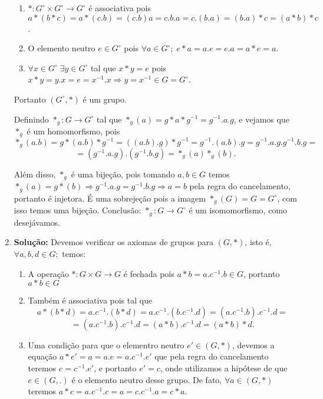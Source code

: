 \documentclass{article}
\begin{document}
\begin{enumerate}
\begin{enumerate}
			\item $*: G^{\circ} \times G^{\circ} \to G^{\circ}$ é associativa pois $a*(b*c) = a*(c.b) = (c.b)a = c.b.a = c.(b.a) = (b.a)*c = (a*b)*c$.
			
			\item O elemento neutro $e \in G^{\circ}$ pois $\forall a \in G^{\circ}; \; e*a = a.e = e.a = a*e =a$.
			
			\item $\forall x \in G^{\circ} \; \exists y \in G^{\circ}$ tal que $x*y=e$ pois $x*y= y.x = e= x^{-1}.x \Rightarrow y = x^{-1} \in G = G^{\circ}$.
		\end{enumerate}
		Portanto $(G^{\circ}, *)$ é um grupo.
		
		Definindo $*_{g}:G\to G^{\circ}$ tal que $*_{g}(a) = g*a*g^{-1} = g^{-1}.a.g$, e vejamos que $*_{g}$ é um homomorfismo, pois 
		$$
		*_{g}(a.b) = g*(a.b)*g^{-1} = ((a.b).g)*g^{-1} = g^{-1}.(a.b).g = g^{-1}.a.g.g^{-1}.b.g=
		$$ 
		$$
		= (g^{-1}.a.g).(g^{-1}.b.g) = *_{g}(a)*_{g}(b).
		$$
		
		Além disso, $*_{g}$ é uma bijeção, pois tomando $a, b \in G$ temos $*_{g}(a) = g*(b) \Rightarrow g^{-1}.a.g = g^{-1}.b.g \Rightarrow a=b$ pela regra do cancelamento, portanto é injetora. É uma sobrejeção pois a imagem $*_{g}(G) = G= G^{\circ}$, com isso temos uma bijeção. Conclusão: $*_{g}:G\to G^{\circ}$ é um isomomorfismo, como desejávamos.
		
		\item \textbf{Solução:} Devemos verificar os axiomas de grupos para $(G,*)$, isto é, $\forall a, b, d \in G; $ temos:
		\begin{enumerate}
			\item A operação $*: G \times G \to G$ é fechada pois $a*b = a.c^{-1}.b \in G$, portanto $a*b \in G$
			
			\item Também é associativa pois tal que 
			$$
			a*(b*d) = a.c^{-1}.(b*d) =  a.c^{-1}.(b.c^{-1}.d) = (a.c^{-1}.b).c^{-1}.d =
			$$
			$$
			= (a.c^{-1}.b).c^{-1}.d = (a*b).c^{-1}.d = (a*b)*d.
			$$
			
			\item Uma condição para que o elementro neutro $e' \in (G,*)$, devemos a equação $a*e' = a = a.e = a.c^{-1}.e'$ que pela regra do cancelamento teremos $e = c^{-1}.e'$, e portanto $ e'=c$, onde utilizamos a hipótese de que $e \in (G,.)$ é o elemento neutro desse grupo. De fato, $\forall a \in (G,*)$ teremos $a*c = a.c^{-1}.c = a = c.c^{-1}.a = c*a$.
			

\end{enumerate}
\end{enumerate}
\end{document}
